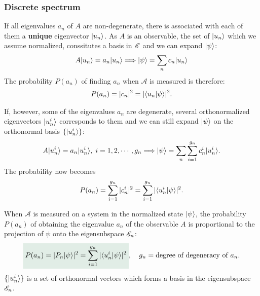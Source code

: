 \subsubsection{Discrete spectrum}
If all eigenvalues $a_n$ of $A$ are non-degenerate, there is associated with each of them a \textbf{unique} eigenvector $|u_n\rangle$.
As $A$ is an observable, the set of $|u_n\rangle$ which we assume normalized, conssitutes a basis in $\mathscr{E}$ and we can expand $|\psi\rangle$:
\begin{align*}
    A|u_n\rangle=a_n|u_n\rangle\Longrightarrow |\psi\rangle=\sum_nc_n|u_n\rangle
\end{align*}
The probability $P(a_n)$ of finding $a_n$ when $\mathcal{A}$ is measured is therefore:
\begin{align*}
    P(a_n)=|c_n|^2=|\langle u_n|\psi\rangle|^2.
\end{align*}

If, however, some of the eigenvalues $a_n$ are degenerate, several orthonormalized eigenvectors $|u_n^i\rangle$ corresponds to them and we can still 
expand $|\psi\rangle$ on the orthonormal basis $\{|u_n^i\rangle\}$:
\begin{align}
    A|u_n^i\rangle=a_n|u_n^i\rangle,\;i=1,2,\cdots,g_n\Longrightarrow |\psi\rangle=\sum_n\sum_{i=1}^{g_n}c_n^i|u_n^i\rangle.
    \label{eq:discretedegenerateexpansion}
\end{align}
The probability now becomes
\begin{align*}
    P(a_n)=\sum_{i=1}^{g_n}|c_n^i|^2=\sum_{i=1}^{g_n}|\langle u_n^i|\psi\rangle|^2.
\end{align*}

\begin{definition}
    When $\mathcal{A}$ is measured on a system in the normalized state $|\psi\rangle$, the probability $P(a_n)$ of 
    obtaining the eigenvalue $a_n$ of the observable $A$ is proportional to the projection of $\psi$ onto the eigensubspace $\mathscr{E}_n$:
    \begin{align*}
        \highlight{P(a_n)=|P_n\ket{\psi}|^2=\sum_{i=1}^{g_n}|\braket{u^i_n|\psi}|^2},\quad g_n=\text{degree of degeneracy of $a_n$}.
    \end{align*}
    $\{|u_n^i\rangle\}$ is a set of orthonormal vectors which forms a basis in the eigensubspace $\mathscr{E}_n$.
\end{definition}
